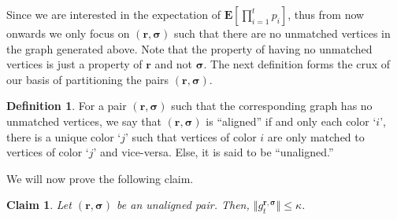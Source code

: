 \documentclass[11pt]{article}
\numberwithin{equation}{section}
\newtheorem{claim}[theorem]{Claim}
\theoremstyle{definition}
\newtheorem{definition}[theorem]{Definition}
\theoremstyle{plain}
\begin{document}
Since we are interested in the expectation of $\mathbf{E}[\prod_{i=1}^t p_i]$, thus from now onwards we only focus on $(\mathbf{r}, \boldsymbol{\sigma})$ such that there are no unmatched vertices in the graph generated above. Note that the property of having no unmatched vertices is just a property of $\mathbf{r}$ and not $\boldsymbol{\sigma}$. The next definition forms the crux  of our basis of partitioning the pairs $(\mathbf{r}, \boldsymbol{\sigma})$. 
\begin{definition}
For a pair $(\mathbf{r}, \boldsymbol{\sigma})$ such that the corresponding graph has no unmatched vertices, we say that $(\mathbf{r}, \boldsymbol{\sigma})$ is ``aligned'' if and only each color `$i$', there is a unique color `$j$' such that vertices of color $i$ are only matched to vertices of color `$j$' and vice-versa. Else, it is said to be ``unaligned.''
\end{definition}
We will now prove the following claim. 
\begin{claim}\label{clm:approx-error2}
Let $(\mathbf{r}, \boldsymbol{\sigma})$ be an unaligned pair. Then,  $\Vert g^{\mathbf{r}, \boldsymbol{\sigma}}_t \Vert \le \kappa$.  \end{claim}
\end{document}
